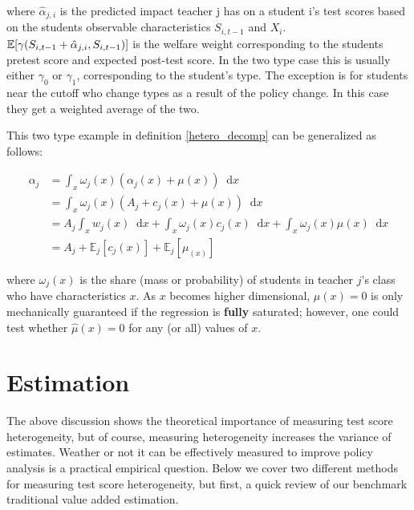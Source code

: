 \documentclass[12pt]{article}
\theoremstyle{definition}
\theoremstyle{definition}
\theoremstyle{definition}
\theoremstyle{definition}
\newcommand*\diff{\mathop{}\!\mathrm{d}}
\begin{document}
    where $\hat{\alpha}_{j,i}$ is the predicted impact teacher j has on a student i's test scores based on the students observable characteristics $S_{i,t-1}$ and  $ X_i$. $\mathbb{E}[\gamma(S_{i,t-1} + \hat{\alpha}_{j,i}, S_{i,t-1})]$ is the welfare weight corresponding to the students pretest score and expected post-test score. In the two type case this is usually either $\gamma_0$ or $\gamma_1$, corresponding to the student's type. The exception is for students near the cutoff who change types as a result of the policy change. In this case they get a weighted average of the two. 
    
    This two type example in definition \ref{hetero_decomp} can be generalized as follows: 

    \begin{align*}
                 \alpha_j  &= \int_x \omega_j(x)(\alpha_j(x) + \mu(x)) \diff x \\
                  &= \int_x \omega_j(x)(A_j + c_j(x) + \mu(x)) \diff x \\
                  &= A_j \int_x w_j(x) \diff x + \int_x \omega_j(x) c_j(x)\diff x + \int_x \omega_j(x) \mu(x)\diff x \\
                  &= A_j  + \mathbb{E}_j[c_j(x)] + \mathbb{E}_j[\mu_(x)] 
    \end{align*}

    
    \noindent where $\omega_j(x)$ is the share (mass or probability) of students in teacher $j$'s class who have characteristics $x$. As $x$ becomes higher dimensional, $\mu(x)=0$ is only mechanically guaranteed if the regression is \textbf{fully} saturated; however, one could test whether $\hat{\mu}(x)=0$ for any (or all) values of $x$.



\section{Estimation}
\label{estimation_section}

    The above discussion shows the theoretical importance of measuring test score heterogeneity, but of course, measuring heterogeneity increases the variance of estimates. Weather or not it can be effectively measured to improve policy analysis is a practical empirical question. Below we cover two different methods for measuring test score heterogeneity, but first, a quick review of our benchmark traditional value added estimation. 


\end{document}

